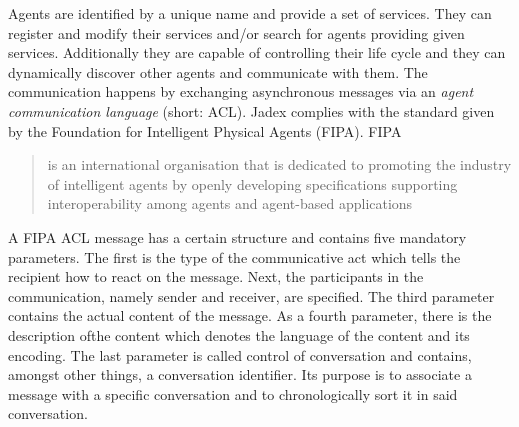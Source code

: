 Agents are identified by a unique name and provide a set of services.
They can register and modify their services and/or search for agents providing given services.
Additionally they are capable of controlling their life cycle and they can dynamically discover other agents and communicate with them.
The communication happens by exchanging asynchronous messages via an \emph{agent communication language} (short: ACL).
Jadex complies with the standard given by the Foundation for Intelligent Physical Agents (FIPA).
FIPA \blockquote[\cite{FIPA}][.]{is an international organisation that is dedicated to promoting the industry of intelligent agents by openly developing specifications supporting interoperability among agents and agent-based applications}
A FIPA ACL message has a certain structure and contains five mandatory parameters.
The first is the type of the communicative act which tells the recipient how to react on the message.
Next, the participants in the communication, namely sender and receiver, are specified.
The third parameter contains the actual content of the message.
As a fourth parameter, there is the description ofthe  content which denotes the language of the content and its encoding.
The last parameter is called control of conversation and contains, amongst other things, a conversation identifier.
Its purpose is to associate a message with a specific conversation and to chronologically sort it in said conversation.


